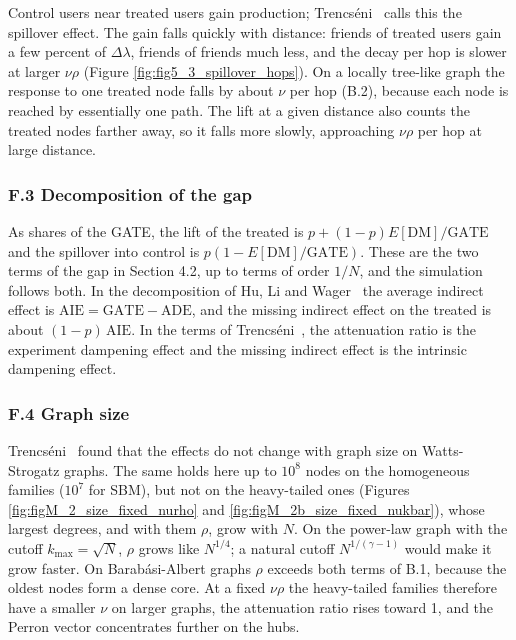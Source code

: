 \documentclass[final,5p,times,twocolumn,number]{elsarticle}
\begin{document}
Control users near treated users gain production; Trencséni~\cite{r20} calls this the spillover effect. The gain falls quickly with distance: friends of treated users gain a few percent of $\Delta\lambda$, friends of friends much less, and the decay per hop is slower at larger $\nu\rho$  (Figure \ref{fig:fig5_3_spillover_hops}). On a locally tree-like graph the response to one treated node falls by about $\nu$  per hop (B.2), because each node is reached by essentially one path. The lift at a given distance also counts the treated nodes farther away, so it falls more slowly, approaching $\nu\rho$  per hop at large distance.


\subsubsection*{F.3 Decomposition of the gap}

As shares of the GATE, the lift of the treated is $p + (1 - p)E[\mathrm{DM}]/\mathrm{GATE}$  and the spillover into control is $p(1 - E[\mathrm{DM}]/\mathrm{GATE})$. These are the two terms of the gap in Section 4.2, up to terms of order $1/N$, and the simulation follows both. In the decomposition of Hu, Li and Wager~\cite{r12} the average indirect effect is $\mathrm{AIE} = \mathrm{GATE} - \mathrm{ADE}$, and the missing indirect effect on the treated is about $(1 - p)\,\mathrm{AIE}$. In the terms of Trencséni~\cite{r20}, the attenuation ratio is the experiment dampening effect and the missing indirect effect is the intrinsic dampening effect.


\subsubsection*{F.4 Graph size}

Trencséni~\cite{r20} found that the effects do not change with graph size on Watts-Strogatz graphs. The same holds here up to $10^8$  nodes on the homogeneous families ($10^7$  for SBM), but not on the heavy-tailed ones (Figures \ref{fig:figM_2_size_fixed_nurho} and \ref{fig:figM_2b_size_fixed_nukbar}), whose largest degrees, and with them $\rho$, grow with $N$. On the power-law graph with the cutoff $k_{\max} = \sqrt N$, $\rho$  grows like $N^{1/4}$; a natural cutoff $N^{1/(\gamma - 1)}$  would make it grow faster. On Barabási-Albert graphs $\rho$  exceeds both terms of B.1, because the oldest nodes form a dense core. At a fixed $\nu\rho$  the heavy-tailed families therefore have a smaller $\nu$  on larger graphs, the attenuation ratio rises toward 1, and the Perron vector concentrates further on the hubs.
\end{document}
